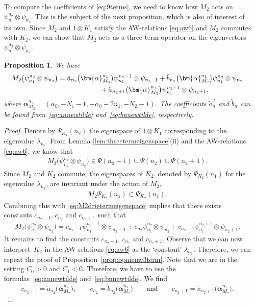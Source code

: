 \documentclass[pdftex]{sigma}
\numberwithin{equation}{section}
\newtheorem{Proposition}[Theorem]{Proposition}
 { \theoremstyle{definition}
\newtheorem{Definition}[Theorem]{Definition}
\newtheorem{Note}[Theorem]{Note}
\newtheorem{Example}[Theorem]{Example}
\newtheorem{Remark}[Theorem]{Remark} }
\begin{document}
To compute the coefficients of \eqref{eq:9terms}, we need to know how $M_2$ acts on $\psi_{n_1}^{n_2}\otimes \psi_{n_2}$. This is the subject of the next proposition, which is also of interest of its own. Since $M_2$ and $1\otimes K_1$ satisfy the AW-relations \eqref{eq:aw6} and $M_2$ commutes with $K_2$, we can show that $M_2$ acts as a three-term operator on the eigenvectors $\psi_{n_1}^{n_2}\otimes \psi_{n_2}$.
\begin{Proposition}\label{prop:casimir3term}
	We have
	\begin{gather*}
M_2\big(\psi_{n_1}^{n_2}\otimes \psi_{n_2}\big)= \tilde{a}_{n_2}\big(\bm{\alpha}_{M_2}^{n_1}\big)\psi_{n_1}^{n_2-1}\otimes \psi_{n_2-1}+\tilde{b}_{n_2}\big(\bm{\alpha}_{M_2}^{n_1}\big)\psi_{n_1}^{n_2}\otimes \psi_{n_2}\\
\hphantom{M_2\big(\psi_{n_1}^{n_2}\otimes \psi_{n_2}\big)=}{}
 +\tilde{a}_{n_2+1}\big(\bm{\alpha}_{M_2}^{n_1}\big)\psi_{n_1}^{n_2+1}\otimes \psi_{n_2+1}, %
	\end{gather*}
	where $\bm{\alpha}_{M_2}^{n_1}=(\alpha_0,-N_1-1,-\alpha_0-2n_1,-N_2-1)$. The coefficients $\tilde{a}_n^2$ and $\tilde{b}_n$ can be found from~\eqref{eq:annewtilde} and~\eqref{eq:bnnewtilde}, respectively.
\end{Proposition}
\begin{proof}
	Denote by $\Psi_{K_1}(n_2)$ the eigenspace of $1\otimes K_1$ corresponding to the eigenvalue $\lambda_{n_2}$. From Lemma \ref{lem:threetermeigenspace}(ii) and the AW-relations \eqref{eq:aw6}, we know that
	\begin{gather}
		M_2 \big(\psi_{n_1}^{n_2}\otimes \psi_{n_2}\big) \in \Psi({n_2}-1)\cup\Psi(n_2)\cup\Psi (n_2+1).\label{eq:M2drietermeigenspace}
	\end{gather}
	Since $M_2$ and $K_2$ commute, the eigenspaces of $K_2$, denoted by $\Psi_{K_2}(n_1)$ for the eigenvalue $\lambda_{n_1}$, are invariant under the action of $M_2$,
	\begin{gather*}
		M_2 \Psi_{K_2}(n_1) \subset \Psi_{K_2}(n_1).
	\end{gather*}
	Combining this with \eqref{eq:M2drietermeigenspace} implies that there exists constants $c_{n_2-1}$, $c_{n_2}$ and $c_{n_2+1}$ such that
	\begin{gather*}
		M_2 \big(\psi_{n_1}^{n_2}\otimes \psi_{n_2}\big) = c_{n_2-1}\psi_{n_1}^{n_2-1}\otimes \psi_{n_2-1}+c_{n_2}\psi_{n_1}^{n_2}\otimes \psi_{n_2}+c_{n_2+1}\psi_{n_1}^{n_2+1}\otimes \psi_{n_2+1}.
	\end{gather*}
	It remains to find the constants $c_{n_2-1}$, $c_{n_2}$ and $c_{n_2+1}$. Observe that we can now interpret~$K_2$ in the AW-relations \eqref{eq:aw6} as the `constant' $\lambda_{n_1}$. Therefore, we can repeat the proof of Proposition~\ref{prop:opnieuw3term}. Note that we are in the setting $C_0>0$ and $C_1 <0$. Therefore, we have to use the formulas~\eqref{eq:annewtilde} and~\eqref{eq:bnnewtilde}. We find
	\[
	c_{n_2-1}=\tilde{a}_{n_2}\big(\bm{\alpha}_{M_2}^{n_1}\big),\qquad c_{n_2}=\tilde{b}_{n_2}\big(\bm{\alpha}_{M_2}^{n_1}\big)\qquad \text{and}\qquad c_{n_2+1}=\tilde{a}_{n_2+1}\big(\bm{\alpha}_{M_2}^{n_1}\big).\tag*{\qed}
	\]\renewcommand{\qed}{}
\end{proof}
\end{document}
